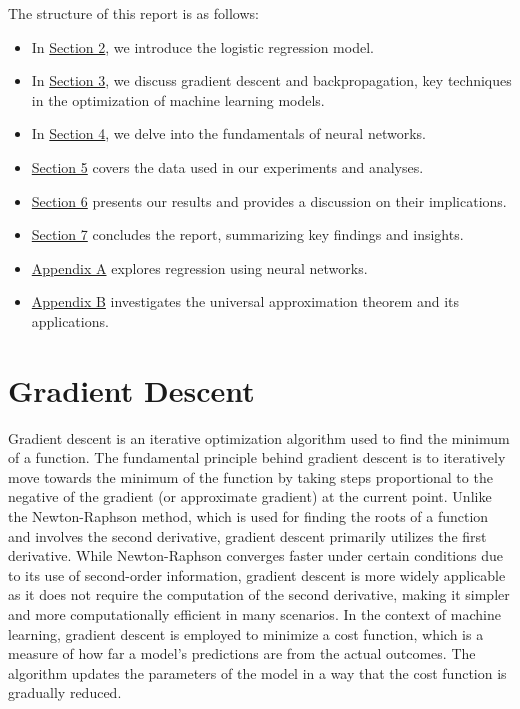 \documentclass[twoside,11pt]{report}
\begin{document}
    \noindent
    The structure of this report is as follows: 
    \begin{itemize}
        \item In \hyperref[sec:logistic]{Section 2}, we introduce the logistic regression model.
        \item In \hyperref[sec:GD]{Section 3}, we discuss gradient descent and backpropagation, key techniques in 
            the optimization of machine learning models.
        \item In \hyperref[sec:NN]{Section 4}, we delve into the fundamentals of neural networks.
        \item \hyperref[sec:data]{Section 5} covers the data used in our experiments and analyses.
        \item \hyperref[sec:resultsdiscussion]{Section 6} presents our results and provides a discussion on their 
            implications.
        \item \hyperref[sec:conclusion]{Section 7} concludes the report, summarizing key findings and insights.
        \item \hyperref[app:appendixA]{Appendix A} explores regression using neural networks.
        \item \hyperref[app:appendixB]{Appendix B} investigates the universal approximation theorem and its applications.
    \end{itemize}


\section{Gradient Descent}
\label{sec:GD}

    Gradient descent is an iterative optimization algorithm used to find the minimum of a function. 
    The fundamental principle behind gradient descent is to iteratively move towards the minimum of the 
    function by taking steps proportional to the negative of the gradient (or approximate gradient) at the current point.
    Unlike the Newton-Raphson method, which is used for finding the roots of a function and involves the second 
    derivative, gradient descent primarily utilizes the first derivative. While Newton-Raphson converges faster 
    under certain conditions due to its use of second-order information, gradient descent is more widely applicable 
    as it does not require the computation of the second derivative, making it simpler and more computationally 
    efficient in many scenarios.
    In the context of machine learning, gradient descent is employed to minimize a cost function, which is a 
    measure of how far a model's predictions are from the actual outcomes. The algorithm updates the parameters 
    of the model in a way that the cost function is gradually reduced.
\end{document}
